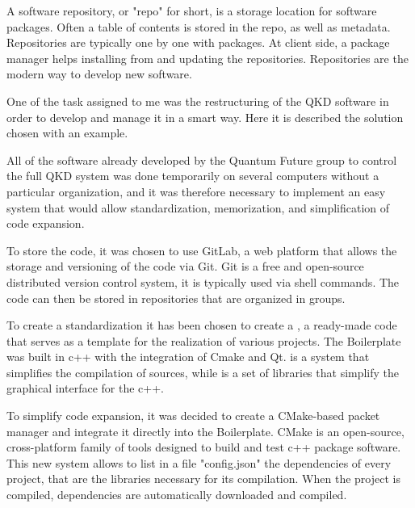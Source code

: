 A software repository, or "repo" for short, is a storage location for software packages. Often a table of contents is stored in the repo, as well as metadata. Repositories are typically one by one with packages. At client side, a package manager helps installing from and updating the repositories. Repositories are the modern way to develop new software.

One of the task assigned to me was the restructuring of the QKD software in order to develop and manage it in a smart way. Here it is described the solution chosen with an example.

\newpage

All of the software already developed by the Quantum Future group to control the full QKD system was done temporarily on several computers without a particular organization, and it was therefore necessary to implement an easy system that would allow standardization, memorization, and simplification of code expansion.

To store the code, it was chosen to use GitLab, a web platform that allows the storage and versioning of the code via Git. Git is a free and open-source distributed version control system, it is typically used via shell commands.
The code can then be stored in repositories that are organized in groups.

To create a standardization it has been chosen to create a , a ready-made code that serves as a template for the realization of various projects. The Boilerplate was built in c++ with the integration of Cmake and Qt.
 is a system that simplifies the compilation of sources, while  is a set of libraries that simplify the graphical interface for the c++.

To simplify code expansion, it was decided to create a CMake-based packet manager and integrate it directly into the Boilerplate. CMake is an open-source, cross-platform family of tools designed to build and test c++ package software.
This new system allows to list in a file "config.json" the dependencies of every project, that are the libraries necessary for its compilation.
When the project is compiled, dependencies are automatically downloaded and compiled.

